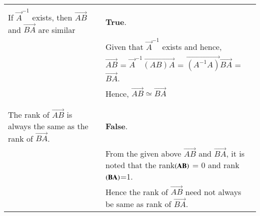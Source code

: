 \documentclass[journal,12pt,twocolumn]{IEEEtran}
\begin{document}
\begin{table}[h]
\begin{tabular}{|m{3cm}|m{14cm}|}
		\hline
		&\\
	    If $\vec{A}^{-1}$ exists, then $\vec{AB}$ and $\vec{BA}$ are similar
		& \textbf{True}. \\
		& Given that $\vec{A}^{-1}$ exists and hence,\\
		&\qquad\qquad\qquad $\vec{AB}$ = $\vec{A}^{-1}\vec{(AB)A}$ =  $\vec{(A^{-1}A)}\vec{BA}$ = $\vec{BA}$.\\
		& Hence, $\vec{AB} \simeq \vec{BA}$ \\
		&\\
		\hline
		&\\
	    The rank of $\vec{AB}$  is always the same as the rank of $\vec{BA}$.
		& \textbf{False}. \\
		& From the given above $\vec{AB}$ and $\vec{BA}$, it is noted that the rank$\left(\mathbf{AB}\right)$ = 0 and rank$\left(\mathbf{BA}\right)$=1. \\
		& Hence the rank of $\vec{AB}$ need not always be same as rank of $\vec{BA}$.
		\\
		\hline
	\end{tabular}
\end{table}
\end{document}
